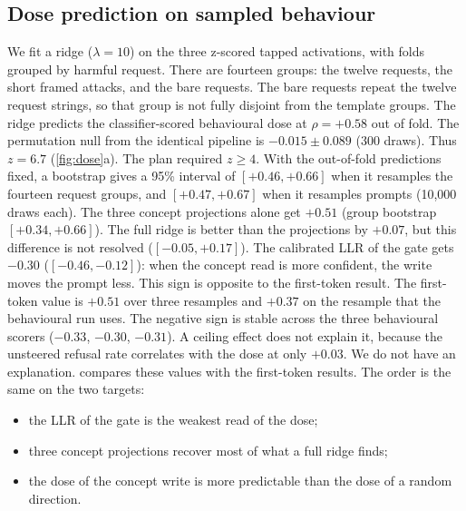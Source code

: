 \documentclass[11pt]{article}
\begin{document}
\subsection{Dose prediction on sampled behaviour}
\label{sec:behaviour}
We fit a ridge ($\lambda=10$) on the three z-scored tapped activations, with folds grouped by harmful request. There are fourteen groups: the twelve requests, the short framed attacks, and the bare requests. The bare requests repeat the twelve request strings, so that group is not fully disjoint from the template groups. The ridge predicts the classifier-scored behavioural dose at $\rho=+0.58$ out of fold. The permutation
null from the identical pipeline is $-0.015\pm0.089$ (300 draws). Thus $z=6.7$ (\cref{fig:dose}a). The plan
required $z\geq4$. With the out-of-fold predictions fixed, a bootstrap gives a 95\% interval of
$[+0.46,+0.66]$ when it resamples the fourteen request groups, and $[+0.47,+0.67]$ when it resamples prompts
(10{,}000 draws each). The three concept
projections alone get $+0.51$ (group bootstrap $[+0.34,+0.66]$). The full ridge is better than the
projections by $+0.07$, but this difference is not resolved ($[-0.05,+0.17]$). The calibrated LLR of the
gate gets $-0.30$ ($[-0.46,-0.12]$): when the concept read is more confident, the write moves the prompt less. This sign is opposite to the first-token result. The
first-token value is $+0.51$ over three resamples and $+0.37$ on the resample that the behavioural run
uses. The negative sign is stable across the three behavioural scorers ($-0.33$, $-0.30$, $-0.31$). A
ceiling effect does not explain it, because the unsteered refusal rate correlates with the dose at only
$+0.03$. We do not have an explanation.  compares these values with the first-token
results. The order is the same on the two targets:
\begin{itemize}[leftmargin=*]
  \item the LLR of the gate is the weakest read of the dose;
  \item three concept projections recover most of what a full ridge finds;
  \item the dose of the concept write is more predictable than the dose of a random direction.
\end{itemize}
\end{document}
